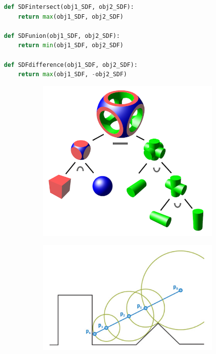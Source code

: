 \begin{lstlisting}[language=Python,caption=Code example showing how SDFs of simpler object can be combined together to gradually build a scene SDF., label=code:sdfs]
def SDFintersect(obj1_SDF, obj2_SDF):
    return max(obj1_SDF, obj2_SDF)

def SDFunion(obj1_SDF, obj2_SDF):
    return min(obj1_SDF, obj2_SDF)

def SDFdifference(obj1_SDF, obj2_SDF):
    return max(obj1_SDF, -obj2_SDF)
\end{lstlisting}

\begin{figure}
	\centering
	\begin{subfigure}{.5\textwidth}
		\centering
		\includegraphics[width=.9\linewidth]{../graphics/csg.png}\label{fig:csg}
	\end{subfigure}%
	\begin{subfigure}{.5\textwidth}
		\centering
		\includegraphics[width=.9\linewidth]{../graphics/marching.png} \label{fig:marching}

\end{subfigure}
\end{figure}
